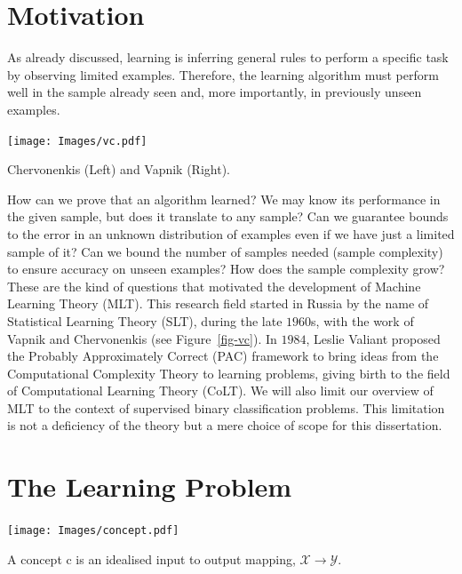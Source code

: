 \documentclass[
  letterpaper,
  12pt,
  british]{tufte-book}
\theoremstyle{plain}
\theoremstyle{plain}
\theoremstyle{definition}
\theoremstyle{remark}
\begin{document}
\hypertarget{motivation}{%
\section{Motivation}\label{motivation}}

As already discussed, learning is inferring general rules to perform a
specific task by observing limited examples. Therefore, the learning
algorithm must perform well in the sample already seen and, more
importantly, in previously unseen examples.

\begin{marginfigure}

{\centering \texttt{[image: Images/vc.pdf]}

}

\caption{\label{fig-vc}Chervonenkis (Left) and Vapnik (Right).}

\end{marginfigure}

How can we prove that an algorithm learned? We may know its performance
in the given sample, but does it translate to any sample? Can we
guarantee bounds to the error in an unknown distribution of examples
even if we have just a limited sample of it? Can we bound the number of
samples needed (sample complexity) to ensure accuracy on unseen
examples? How does the sample complexity grow? These are the kind of
questions that motivated the development of Machine Learning Theory
(MLT). This research field started in Russia by the name of Statistical
Learning Theory (SLT), during the late \(1960\)s, with the work of
Vapnik and Chervonenkis (see Figure~\ref{fig-vc}). In \(1984\), Leslie
Valiant proposed the Probably Approximately Correct (PAC) framework to
bring ideas from the Computational Complexity Theory to learning
problems, giving birth to the field of Computational Learning Theory
(CoLT). We will also limit our overview of MLT to the context of
supervised binary classification problems. This limitation is not a
deficiency of the theory but a mere choice of scope for this
dissertation.

\hypertarget{the-learning-problem}{%
\section{The Learning Problem}\label{the-learning-problem}}

\begin{marginfigure}

{\centering \texttt{[image: Images/concept.pdf]}

}

\caption{\label{fig-concept}A concept c is an idealised input to output
mapping, \(\mathcal{X}\to \mathcal{Y}\).}

\end{marginfigure}
\end{document}
